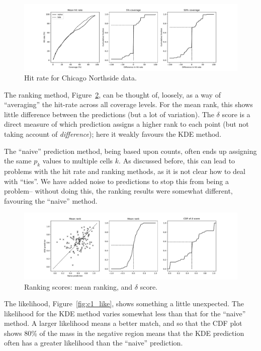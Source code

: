 \documentclass[twoside,a4paper,twocolumn,10pt]{article}
\theoremstyle{plain}
\theoremstyle{definition}
\begin{document}
\begin{figure}
	\includegraphics[width=\textwidth]{../details/northside_hitrate.pdf}
  \caption{Hit rate for Chicago Northside data.}
   \label{fig:c1_hitrate}
\end{figure}

The ranking method, Figure~\ref{fig:c1_ranking}, can be thought of, loosely, as a way of
``averaging'' the hit-rate across all coverage levels.  For the mean rank, this shows little
difference between the predictions (but a lot of variation).  The $\delta$ score is a direct
measure of which prediction assigns a higher rank to each point (but not taking account of
\emph{difference}); here it weakly favours the KDE method.

The ``naive'' prediction method, being based upon counts, often ends up assigning the same
$p_k$ values to multiple cells $k$.  As discussed before, this can lead to problems with the
hit rate and ranking methods, as it is not clear how to deal with ``ties''.  We have added
noise to predictions to stop this from being a problem-- without doing this, the ranking
results were somewhat different, favouring the ``naive'' method.

\begin{figure}
	\includegraphics[width=\textwidth]{../details/northside_ranking.pdf}
  \caption{Ranking scores: mean ranking, and $\delta$ score.}
   \label{fig:c1_ranking}
\end{figure}

The likelihood, Figure~\ref{fig:c1_like}, shows something a little unexpected.
The likelihood for the KDE method varies somewhat less than that for the ``naive'' method.
A larger likelihood means a better match, and so that the CDF plot shows 80\% of the mass
in the negative region means that the KDE prediction often has a greater likelihood
than the ``naive'' prediction.
\end{document}
